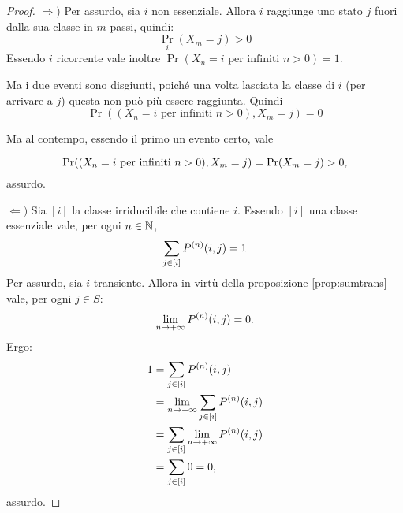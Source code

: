 \begin{proof}
	$\Rightarrow)$
	Per assurdo, sia $i$ non essenziale. Allora $i$ raggiunge uno stato $j$ fuori dalla sua classe in $m$ passi, quindi:
	\begin{equation*}
		\Pr_i(X_m=j)>0
	\end{equation*}
	Essendo $i$ ricorrente vale inoltre $\Pr(X_n=i \text{ per infiniti $n>0$})=1$.

	Ma i due eventi sono disgiunti, poiché una volta lasciata la classe di $i$ (per arrivare a $j$) questa non può più essere raggiunta. Quindi
	\begin{equation*}
		\Pr((X_n=i \text{ per infiniti $n>0$}),X_m=j) = 0
	\end{equation*}

	Ma al contempo, essendo il primo un evento certo, vale

	\begin{equation*}
		\Pr((X_n=i \text{ per infiniti $n>0$}),X_m=j) = \Pr(X_m=j)>0 \text,
	\end{equation*}
	assurdo.

	$\Leftarrow)$
	Sia $[i]$ la classe irriducibile che contiene $i$. Essendo $[i]$ una classe essenziale vale, per ogni $n\in\N$,
	\begin{equation*}
		\sum_{j\in[i]} P\ape{n}(i,j) = 1
	\end{equation*}
	Per assurdo, sia $i$ transiente. Allora in virtù della proposizione \ref{prop:sumtrans} vale, per ogni $j\in S$:
	\begin{equation*}
		\lim_{n\to+\infty} P\ape{n}(i,j) = 0 \text.
	\end{equation*}
	Ergo:
	\begin{align*}
		1 & = \sum_{j\in[i]} P\ape{n}(i,j)                    \\
		  & = \lim_{n\to+\infty} \sum_{j\in[i]} P\ape{n}(i,j) \\
		  & = \sum_{j\in[i]} \lim_{n\to+\infty} P\ape{n}(i,j) \\
		  & = \sum_{j\in[i]} 0 = 0 \text,
	\end{align*}
	assurdo. \qedhere
\end{proof}
